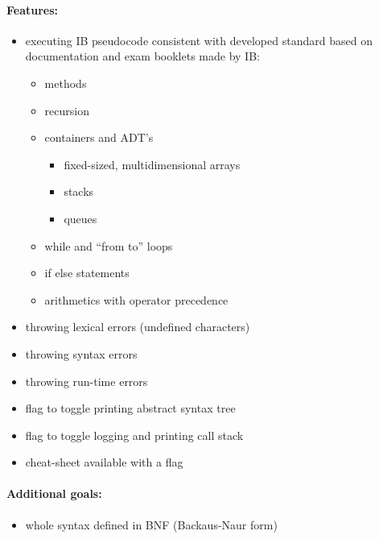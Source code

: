 \documentclass{article}
\begin{document}
\paragraph{Features:}
\begin{itemize}
    \item executing IB pseudocode consistent with developed 
        standard based on documentation and exam booklets made by IB:
        \begin{itemize}
            \item methods
            \item recursion
            \item containers and ADT's
                \begin{itemize}
                    \item fixed-sized, multidimensional arrays
                    \item stacks 
                    \item queues
                \end{itemize}
            \item while and ``from to'' loops
            \item if else statements
            \item arithmetics with operator precedence
        \end{itemize}
    \item throwing lexical errors (undefined characters)
    \item throwing syntax errors
    \item throwing run-time errors
    \item flag to toggle printing abstract syntax tree
    \item flag to toggle logging and printing call stack
    \item cheat-sheet available with a flag
\end{itemize}
\paragraph{Additional goals:}
\begin{itemize}
    \item whole syntax defined in BNF (Backaus-Naur form)

\end{itemize}
\end{document}

